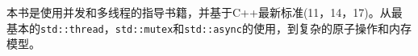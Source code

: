 
本书是使用并发和多线程的指导书籍，并基于C++最新标准(11，14，17)。从最基本的\texttt{std::thread}，\texttt{std::mutex}和\texttt{std::async}的使用，到复杂的原子操作和内存模型。




















